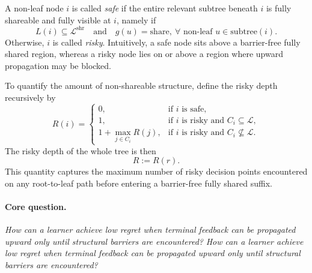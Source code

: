 A non-leaf node $i$ is called \emph{safe} if the entire relevant subtree beneath $i$ is fully shareable and fully visible at $i$, namely if
\[
L(i) \subseteq \mathcal{L}^{\mathrm{shr}}
\quad \text{and} \quad
g(u)=\mathrm{share}, \ \forall \text{ non-leaf } u \in \mathrm{subtree}(i).
\]
Otherwise, $i$ is called \emph{risky}. Intuitively, a safe node sits above a barrier-free fully shared region, whereas a risky node lies on or above a region where upward propagation may be blocked.

To quantify the amount of non-shareable structure, define the risky depth recursively by
\[
R(i)=
\begin{cases}
0, & \text{if } i \text{ is safe},\\
1, & \text{if } i \text{ is risky and } C_i \subseteq \mathcal{L},\\
1+\max_{j \in C_i} R(j), & \text{if } i \text{ is risky and } C_i \not\subseteq \mathcal{L}.
\end{cases}
\]
The risky depth of the whole tree is then
\[
R := R(r).
\]
This quantity captures the maximum number of risky decision points encountered on any root-to-leaf path before entering a barrier-free fully shared suffix.

\paragraph{Core question.}
\emph{How can a learner achieve low regret when terminal feedback can be propagated upward only until structural barriers are encountered?}
\emph{How can a learner achieve low regret when terminal feedback can be propagated upward only until structural barriers are encountered?}